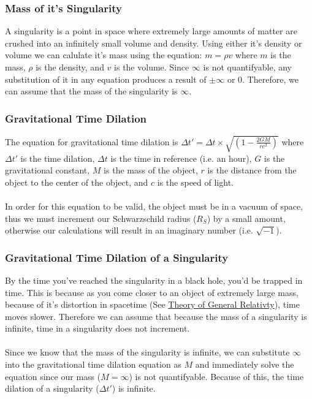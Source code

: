 \documentclass{article}
\begin{document}
\subsubsection{Mass of it's Singularity}
A singularity is a point in space where extremely large amounts of matter are crushed into an infinitely small volume and density. Using either it's density or volume we can calulate it's mass using the equation: $m = \rho v$ where $m$ is the mass, $\rho$ is the density, and $v$ is the volume. Since $\infty$ is not quantifyable, any substitution of it in any equation produces a result of $\pm \infty$ or 0. Therefore, we can assume that the mass of the singularity is $\infty$.

\subsubsection{Gravitational Time Dilation}
The equation for gravitational time dilation is $\Delta t\prime = \Delta t\times\sqrt{(1-\frac{2GM}{rc^2})}$ where $\Delta t\prime$ is the time dilation, $\Delta t$ is the time in reference (i.e. an hour), $G$ is the gravitational constant, $M$ is the mass of the object, $r$ is the distance from the object to the center of the object, and $c$ is the speed of light.\\\\
In order for this equation to be valid, the object must be in a vacuum of space, thus we must increment our Schwarzschild radius ($R_{S}$) by a small amount, otherwise our calculations will result in an imaginary number (i.e. $\sqrt{-1}$).

\subsubsection{Gravitational Time Dilation of a Singularity}
By the time you've reached the singularity in a black hole, you'd be trapped in time. This is because as you come closer to an object of extremely large mass, because of it's distortion in spacetime (See \hyperref[sec:generalrelativity]{Theory of General Relativty}), time moves slower. Therefore we can assume that because the mass of a singularity is infinite, time in a singularity does not increment. \\\\
Since we know that the mass of the singularity is infinite, we can substitute $\infty$ into the gravitational time dilation equation as $M$ and immediately solve the equation since our mass ($M = \infty$) is not quantifyable. Because of this, the time dilation of a singularity ($\Delta t\prime$) is infinite.
\end{document}
